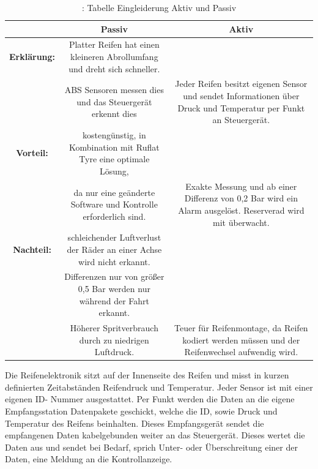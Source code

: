 				\begin{table}
					
				\begin{tabular}{c|c|c}
					
					\textbf {  } & \textbf{Passiv} & \textbf {Aktiv}\\
					
					
					\hline
					\textbf{Erklärung:} & Platter Reifen hat einen kleineren Abrollumfang und dreht sich schneller.\\&ABS Sensoren messen dies und das Steuergerät erkennt dies & Jeder Reifen besitzt eigenen Sensor und sendet Informationen über Druck und Temperatur per Funkt an Steuergerät.\\
					
					
					\hline
					\textbf{Vorteil:} & kostengünstig, in Kombination mit Ruflat Tyre eine optimale Lösung, \\&da nur eine geänderte Software und Kontrolle erforderlich sind. & Exakte Messung und ab einer Differenz von 0,2 Bar wird ein Alarm ausgelöst. Reserverad wird mit überwacht.\\
					

					\hline
					\textbf{Nachteil:} & schleichender Luftverlust der Räder an einer Achse wird nicht erkannt.\\&Differenzen nur von größer 0,5 Bar werden nur während der Fahrt erkannt.\\&  Höherer Spritverbrauch durch zu niedrigen Luftdruck. & Teuer für Reifenmontage, da Reifen kodiert werden müssen und der Reifenwechsel aufwendig wird.\\
					\hline
				
				\end{tabular}
			\caption{ \cite{TS22}: Tabelle Eingleiderung Aktiv und Passiv}
			\end{table}	
			
			
				\begin{flushleft}
						
					Die Reifenelektronik sitzt auf der Innenseite des Reifen und misst in kurzen definierten Zeitabständen Reifendruck und Temperatur. Jeder Sensor ist mit einer eigenen ID- Nummer ausgestattet. Per Funkt werden die Daten an die eigene Empfangsstation Datenpakete geschickt, welche die ID, sowie Druck und Temperatur des Reifens beinhalten. Dieses Empfangsgerät sendet die empfangenen Daten kabelgebunden weiter an das Steuergerät. Dieses wertet die Daten aus und sendet bei Bedarf, sprich Unter- oder Überschreitung einer der Daten, eine Meldung an die Kontrollanzeige.
					
				\end{flushleft}	
				
